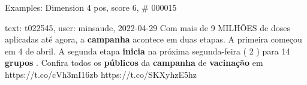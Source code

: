 \begin{frame}{Examples: Dimension 4 pos, score 6, \# 000015}
\footnotesize
\begin{exampleblock}{text: t022545, user: minsaude, 2022-04-29}
Com mais de 9 MILHÕES de doses aplicadas até agora, a \textbf{campanha} 
acontece em duas etapas.  A primeira começou em 4 de abril. 
 A segunda etapa \textbf{inicia} na próxima segunda-feira ( 2 ) 
para 14 \textbf{grupos} .  Confira todos os 
\textbf{públicos} da \textbf{campanha} de \textbf{vacinação} em 
https://t.co/cVh3mI16zb https://t.co/SKXyhzE5hz 
\end{exampleblock}
\end{frame}
